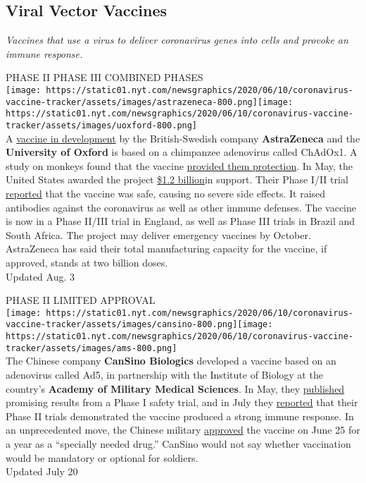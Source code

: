 \hypertarget{viral-vector-vaccines}{%
\subsection{\texorpdfstring{\textbf{Viral Vector
Vaccines}}{Viral Vector Vaccines}}\label{viral-vector-vaccines}}

\emph{Vaccines that use a virus to deliver coronavirus genes into cells
and provoke an immune response.}

PHASE II PHASE III COMBINED PHASES\\
\texttt{[image: https://static01.nyt.com/newsgraphics/2020/06/10/coronavirus-vaccine-tracker/assets/images/astrazeneca-800.png]}\texttt{[image: https://static01.nyt.com/newsgraphics/2020/06/10/coronavirus-vaccine-tracker/assets/images/uoxford-800.png]}\\
A
\href{https://www.nytimes.com/2020/04/27/world/europe/coronavirus-vaccine-update-oxford.html}{vaccine
in development} by the British-Swedish company \textbf{AstraZeneca} and
the \textbf{University of Oxford} is based on a chimpanzee adenovirus
called ChAdOx1. A study on monkeys found that the vaccine
\href{https://www.nytimes.com/2020/07/30/health/covid-19-vaccine-monkeys.html}{provided
them protection}. In May, the United States awarded the project
\href{https://www.nytimes.com/2020/05/21/health/coronavirus-vaccine-astrazeneca.html?searchResultPosition=7}{\$1.2
billion}in support. Their Phase I/II trial
\href{https://www.thelancet.com/lancet/article/s0140-6736(20)31604-4}{reported}
that the vaccine was safe, causing no severe side effects. It raised
antibodies against the coronavirus as well as other immune defenses. The
vaccine is now in a Phase II/III trial in England, as well as Phase III
trials in Brazil and South Africa. The project may deliver emergency
vaccines by October. AstraZeneca has said their total manufacturing
capacity for the vaccine, if approved, stands at two billion doses.\\
Updated Aug. 3

PHASE II LIMITED APPROVAL\\
\texttt{[image: https://static01.nyt.com/newsgraphics/2020/06/10/coronavirus-vaccine-tracker/assets/images/cansino-800.png]}\texttt{[image: https://static01.nyt.com/newsgraphics/2020/06/10/coronavirus-vaccine-tracker/assets/images/ams-800.png]}\\
The Chinese company \textbf{CanSino Biologics} developed a vaccine based
on an adenovirus called Ad5, in partnership with the Institute of
Biology at the country's \textbf{Academy of Military Medical Sciences}.
In May, they
\href{https://www.nytimes.com/2020/05/22/health/coronavirus-vaccine-china.html}{published}
promising results from a Phase I safety trial, and in July they
\href{https://www.thelancet.com/lancet/article/s0140-6736(20)31605-6}{reported}
that their Phase II trials demonstrated the vaccine produced a strong
immune response. In an unprecedented move, the Chinese military
\href{https://www.nytimes.com/2020/07/16/business/china-vaccine-coronavirus.html}{approved}
the vaccine on June 25 for a year as a ``specially needed drug.''
CanSino would not say whether vaccination would be mandatory or optional
for soldiers.\\
Updated July 20

